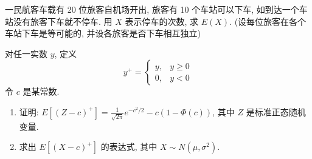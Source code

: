 \documentclass[../main.tex]{subfiles}
\begin{document}
\begin{exercise}{}{}
一民航客车载有 20 位旅客自机场开出, 旅客有 10 个车站可以下车, 如到达一个车站没有旅客下车就不停车. 用 $X$ 表示停车的次数, 求 $E(X)$. (设每位旅客在各个车站下车是等可能的, 并设各旅客是否下车相互独立)
\end{exercise}

\begin{exercise}{}{}
对任一实数 $y$, 定义
\[
y^+ = \begin{cases}
y, & y \ge 0 \\
0, & y < 0
\end{cases}
\]
令 $c$ 是某常数.
\begin{enumerate}
    \item[(a)] 证明: $E[(Z-c)^+] = \frac{1}{\sqrt{2\pi}}e^{-c^2/2} - c(1-\Phi(c))$, 其中 $Z$ 是标准正态随机变量.
    \item[(b)] 求出 $E[(X-c)^+]$ 的表达式, 其中 $X \sim N(\mu, \sigma^2)$.
\end{enumerate}
\end{exercise}
\end{document}
